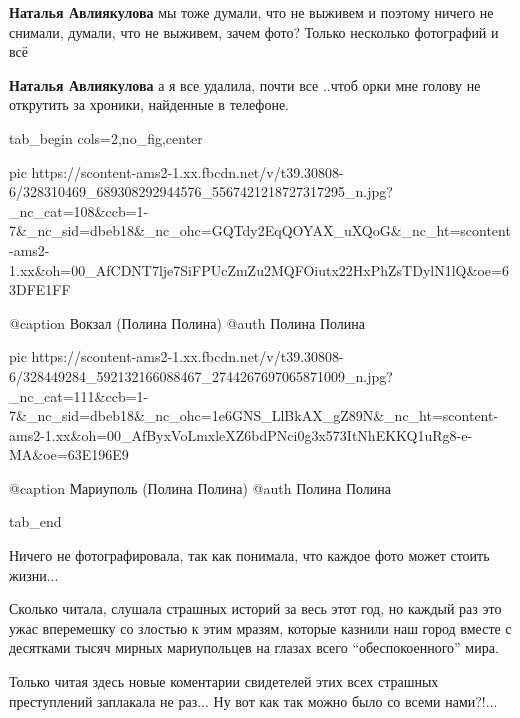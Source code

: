 \begin{itemize} %
\textbf{Наталья Авлиякулова} мы тоже думали, что не выживем и поэтому ничего не снимали, думали, что не выживем, зачем фото? Только несколько фотографий и всё

\textbf{Наталья Авлиякулова} а я все удалила, почти все ..чтоб орки мне голову не открутить за хроники, найденные в телефоне.
\end{itemize} %

\clearpage
{}

\ifcmt
  tab_begin cols=2,no_fig,center

     pic https://scontent-ams2-1.xx.fbcdn.net/v/t39.30808-6/328310469_689308292944576_5567421218727317295_n.jpg?_nc_cat=108&ccb=1-7&_nc_sid=dbeb18&_nc_ohc=GQTdy2EqQOYAX_uXQoG&_nc_ht=scontent-ams2-1.xx&oh=00_AfCDNT7lje7SiFPUcZmZu2MQFOiutx22HxPhZsTDylN1lQ&oe=63DFE1FF

     @caption Вокзал (Полина Полина)
     @auth Полина Полина

     pic https://scontent-ams2-1.xx.fbcdn.net/v/t39.30808-6/328449284_592132166088467_2744267697065871009_n.jpg?_nc_cat=111&ccb=1-7&_nc_sid=dbeb18&_nc_ohc=1e6GNS_LlBkAX_gZ89N&_nc_ht=scontent-ams2-1.xx&oh=00_AfByxVoLmxleXZ6bdPNci0g3x573ItNhEKKQ1uRg8-e-MA&oe=63E196E9

     @caption Мариуполь (Полина Полина)
     @auth Полина Полина

  tab_end
\fi


Ничего не фотографировала, так как понимала, что каждое фото может стоить жизни...


Сколько читала, слушала страшных историй за весь этот год, но каждый раз это
ужас вперемешку со злостью к этим мразям, которые казнили наш город вместе с
десятками тысяч мирных мариупольцев на глазах всего \enquote{обеспокоенного} мира.

Только читая здесь новые коментарии свидетелей этих всех страшных преступлений
заплакала не раз... Ну вот как так можно было со всеми нами?!...


